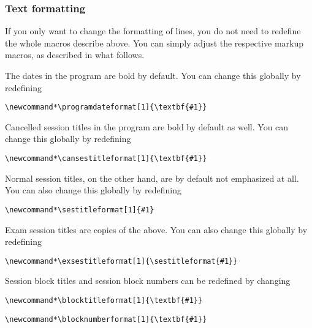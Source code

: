 \documentclass[english]{article}
\begin{document}
\subsubsection{Text formatting}\label{subsec:textform}

If you only want to change the formatting of lines, you do not need to redefine the whole macros
describe above. You can simply adjust the respective markup macros, as described in what follows.

The dates in the program are bold by default. You can change this globally by redefining
\begin{lstlisting}[language={[LaTeX]TeX},basicstyle={\small\ttfamily},frame=single,
moretexcs={[1]{programdateformat}}]
\newcommand*\programdateformat[1]{\textbf{#1}}
\end{lstlisting}
%
Cancelled session titles in the program are bold by default as well. You can change this globally by redefining
\begin{lstlisting}[language={[LaTeX]TeX},basicstyle={\small\ttfamily},frame=single,
frame=single,moretexcs={[1]{cansestitleformat}}]
\newcommand*\cansestitleformat[1]{\textbf{#1}}
\end{lstlisting}
%
Normal session titles, on the other hand, are by default not emphasized at all. You can also change this
globally by redefining
\begin{lstlisting}[language={[LaTeX]TeX},basicstyle={\small\ttfamily},frame=single,
frame=single,moretexcs={[1]{sestitleformat}}]
\newcommand*\sestitleformat[1]{#1}
\end{lstlisting}
%
Exam session titles are copies of the above. You can also change this
globally by redefining
\begin{lstlisting}[language={[LaTeX]TeX},basicstyle={\small\ttfamily},frame=single,
frame=single,moretexcs={[2]{exsestitleformat,sestitleformat}}]
\newcommand*\exsestitleformat[1]{\sestitleformat{#1}}
\end{lstlisting}
%
Session block titles and session block numbers can be redefined by changing
\begin{lstlisting}[language={[LaTeX]TeX},basicstyle={\small\ttfamily},frame=single,
frame=single,moretexcs={[1]{blocktitleformat}}]
\newcommand*\blocktitleformat[1]{\textbf{#1}}
\end{lstlisting}
\begin{lstlisting}[language={[LaTeX]TeX},basicstyle={\small\ttfamily},frame=single,
frame=single,moretexcs={[1]{blocknumberformat}}]
\newcommand*\blocknumberformat[1]{\textbf{#1}}
\end{lstlisting}
\end{document}
